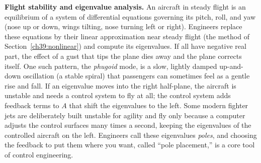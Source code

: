\begin{applicationbox}
\textbf{Flight stability and eigenvalue analysis.} An aircraft in
steady flight is an equilibrium of a system of differential equations governing
its pitch, roll, and yaw (nose up or down, wings tilting, nose turning left or
right). Engineers replace these equations by their linear approximation near
steady flight (the method of Section~\ref{ch39:nonlinear}) and compute its
eigenvalues. If all have negative real part, the effect of a gust that tips the
plane dies away and the plane corrects itself. One such pattern, the
\emph{phugoid} mode, is a slow, lightly damped up-and-down oscillation (a stable
spiral) that passengers can sometimes feel as a gentle rise and fall. If an
eigenvalue moves into the right half-plane, the aircraft is unstable and needs a
control system to fly at all; the control system adds feedback terms to $A$
that shift the eigenvalues to the left. Some modern fighter jets are deliberately
built unstable for agility and fly only because a computer adjusts the control
surfaces many times a second, keeping the eigenvalues of the controlled aircraft
on the left. Engineers call these eigenvalues \emph{poles}, and choosing the
feedback to put them where you want, called ``pole placement,'' is a core tool
of control engineering.
\end{applicationbox}

